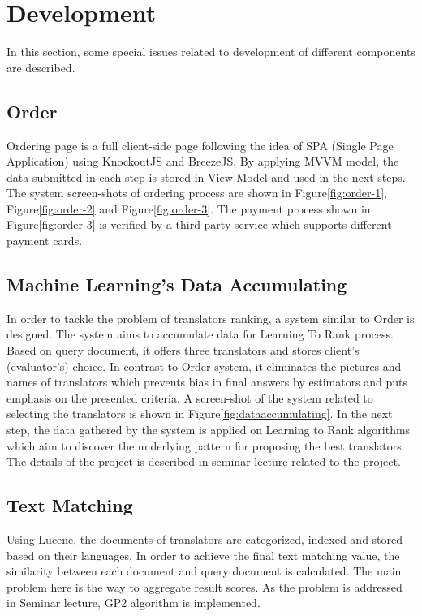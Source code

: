 \section{Development}
\label{sec:development}
In this section, some special issues related to development of different components are described.

\subsection{Order}
Ordering page is a full client-side page following the idea of SPA (Single Page Application) using KnockoutJS and BreezeJS. By applying MVVM model, the data submitted in each step is stored in View-Model and used in the next steps. The system screen-shots of ordering process are shown in Figure\ref{fig:order-1}, Figure\ref{fig:order-2} and Figure\ref{fig:order-3}.  The payment process shown in Figure\ref{fig:order-3} is verified by a third-party service which supports different payment cards.

\subsection{Machine Learning's Data Accumulating}
In order to tackle the problem of translators ranking, a system similar to Order is designed. The system aims to accumulate data for Learning To Rank process. Based on query document, it offers three translators and stores client's (evaluator's) choice. In contrast to Order system, it eliminates the pictures and names of translators which prevents bias in final answers by estimators and puts emphasis on the presented criteria. A screen-shot of the system related to selecting the translators is shown in Figure\ref{fig:dataaccumulating}. In the next step, the data gathered by the system is applied on Learning to Rank algorithms which aim to discover the underlying pattern for proposing the best translators. The details of the project is described in seminar lecture related to the project. 

\subsection{Text Matching}
Using Lucene, the documents of translators are categorized, indexed and stored based on their languages. In order to achieve the final text matching value, the similarity between each document and query document is calculated. The main problem here is the way to  aggregate result scores. As the problem is addressed in Seminar lecture, GP2\cite{gp2} algorithm is implemented.

